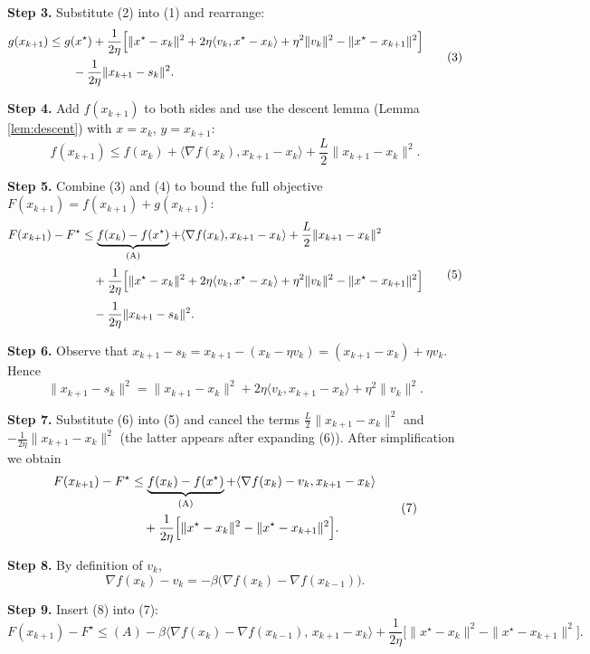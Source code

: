 \documentclass[11pt]{article}
\newcommand{\grad}{\nabla}
\begin{document}
\noindent\textbf{Step 3.} Substitute (2) into (1) and rearrange:
\[
\begin{aligned}
g(x_{k+1}) &\le g(x^\star)+\frac{1}{2\eta}\Bigl[\|x^\star-x_k\|^{2}
+2\eta\langle v_k, x^\star-x_k\rangle+\eta^{2}\|v_k\|^{2}
-\|x^\star-x_{k+1}\|^{2}\Bigr]\\
&\qquad -\frac{1}{2\eta}\|x_{k+1}-s_k\|^{2}.
\end{aligned}
\tag{3}
\]

\noindent\textbf{Step 4.} Add $f(x_{k+1})$ to both sides and use the descent lemma (Lemma \ref{lem:descent}) with $x=x_k$, $y=x_{k+1}$:
\[
f(x_{k+1})\le f(x_k)+\langle\grad f(x_k),x_{k+1}-x_k\rangle+\frac{L}{2}\|x_{k+1}-x_k\|^{2}.
\tag{4}
\]

\noindent\textbf{Step 5.} Combine (3) and (4) to bound the full objective $F(x_{k+1})=f(x_{k+1})+g(x_{k+1})$:
\[
\begin{aligned}
F(x_{k+1})-F^\star
&\le \underbrace{f(x_k)-f(x^\star)}_{\text{(A)}}
   +\langle\grad f(x_k),x_{k+1}-x_k\rangle
   +\frac{L}{2}\|x_{k+1}-x_k\|^{2} \\[2pt]
&\quad +\frac{1}{2\eta}\Bigl[\|x^\star-x_k\|^{2}
   +2\eta\langle v_k, x^\star-x_k\rangle
   +\eta^{2}\|v_k\|^{2}
   -\|x^\star-x_{k+1}\|^{2}\Bigr]\\[2pt]
&\quad -\frac{1}{2\eta}\|x_{k+1}-s_k\|^{2}.
\end{aligned}
\tag{5}
\]

\noindent\textbf{Step 6.} Observe that $x_{k+1}-s_k = x_{k+1}-(x_k-\eta v_k)= (x_{k+1}-x_k)+\eta v_k$. Hence
\[
\|x_{k+1}-s_k\|^{2}= \|x_{k+1}-x_k\|^{2}+2\eta\langle v_k, x_{k+1}-x_k\rangle+\eta^{2}\|v_k\|^{2}.
\tag{6}
\]

\noindent\textbf{Step 7.} Substitute (6) into (5) and cancel the terms $\frac{L}{2}\|x_{k+1}-x_k\|^{2}$ and $-\frac{1}{2\eta}\|x_{k+1}-x_k\|^{2}$ (the latter appears after expanding (6)). After simplification we obtain
\[
\begin{aligned}
F(x_{k+1})-F^\star
&\le \underbrace{f(x_k)-f(x^\star)}_{\text{(A)}}
   +\langle\grad f(x_k)-v_k, x_{k+1}-x_k\rangle\\
&\quad +\frac{1}{2\eta}\Bigl[\|x^\star-x_k\|^{2}
   -\|x^\star-x_{k+1}\|^{2}\Bigr].
\end{aligned}
\tag{7}
\]

\noindent\textbf{Step 8.} By definition of $v_k$,
\[
\grad f(x_k)-v_k = -\beta\bigl(\grad f(x_k)-\grad f(x_{k-1})\bigr).
\tag{8}
\]

\noindent\textbf{Step 9.} Insert (8) into (7):
\[
F(x_{k+1})-F^\star
\le (A) -\beta\bigl\langle\grad f(x_k)-\grad f(x_{k-1}),\,x_{k+1}-x_k\bigr\rangle
+\frac{1}{2\eta}\bigl[\|x^\star-x_k\|^{2}-\|x^\star-x_{k+1}\|^{2}\bigr].
\tag{9}
\]
\end{document}
